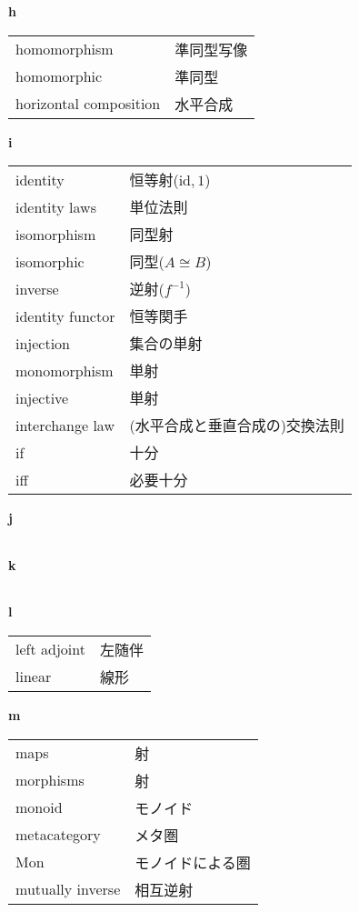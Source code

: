 \documentclass[dvipdfmx]{jsarticle}
\begin{document}
\textbf{h}

  \begin{tabular}{ll}
    homomorphism & 準同型写像 \\
    homomorphic & 準同型 \\
    horizontal composition & 水平合成 \\
  \end{tabular}

\textbf{i}

  \begin{tabular}{ll}
    identity & 恒等射($\mathrm{id},1$) \\
    identity laws & 単位法則 \\
    isomorphism & 同型射 \\
    isomorphic & 同型($A \cong B$) \\
    inverse & 逆射($f^{-1}$) \\
    identity functor & 恒等関手 \\
    injection & 集合の単射 \\
    monomorphism & 単射 \\
    injective & 単射 \\
    interchange law & (水平合成と垂直合成の)交換法則 \\
    if & 十分 \\
    iff & 必要十分 \\
  \end{tabular}

\textbf{j}

  \begin{tabular}{ll}
  \end{tabular}

\textbf{k}

  \begin{tabular}{ll}
  \end{tabular}

\textbf{l}

  \begin{tabular}{ll}
    left adjoint & 左随伴 \\
    linear & 線形 \\
  \end{tabular}

\textbf{m}

  \begin{tabular}{ll}
    maps & 射 \\
    morphisms & 射 \\
    monoid & モノイド \\
    metacategory & メタ圏 \\
    Mon & モノイドによる圏 \\
    mutually inverse & 相互逆射 \\
  \end{tabular}
\end{document}

